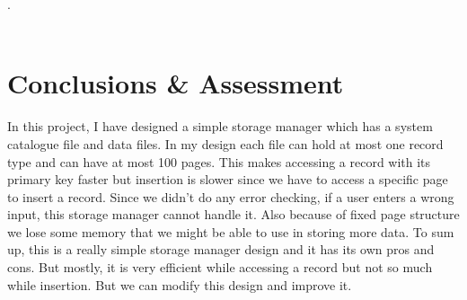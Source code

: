\documentclass[12pt,a4paper]{article}
\begin{document}
{\LARGE .}\\[2cm]\\
\section{Conclusions \& Assessment}
    In this project, I have designed a simple storage manager which has a system catalogue file and data files. In my design each file can hold at most one record type and can have at most 100 pages. This makes accessing a record with its primary key faster but insertion is slower since we have to access a specific page to insert a record. Since we didn’t do any error checking, if a user enters a wrong input, this storage manager cannot handle it. Also because of fixed page structure we lose some memory that we might be able to use in storing more data. To sum up, this is a really simple storage manager design and it has its own pros and cons. But mostly, it is very efficient while accessing a record but not so much while insertion. But we can modify this design and improve it. 
\end{document}
